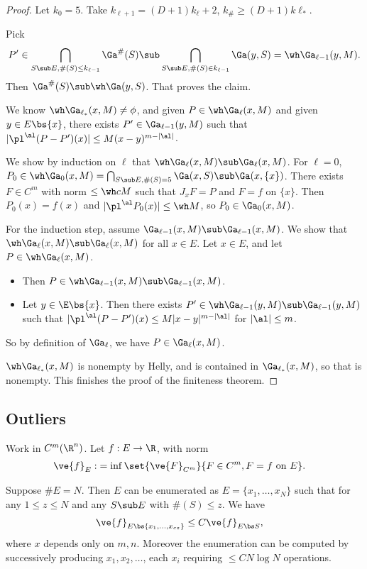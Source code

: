 \begin{proof}
Let $k_0=5$. Take $k_{\ell+1} = (D+1)k_\ell + 2$, $k_\#\ge (D+1)k \ell_*$. 

Pick 
\begin{align}
P'\in \bigcap_{S\sub E, \#(S)\le k_{\ell-1}} \Ga^\#(S) \sub \bigcap_{S\sub E, \#(S)\in k_{\ell-1}} \Ga(y,S) =\wh\Ga_{\ell-1}(y,M).
\end{align}
Then $\Ga^\#(S)\sub \wh \Ga(y,S)$. %
That proves the claim. %

We know $\wh \Ga_{\ell_*}(x,M)\ne \phi$, and given $P\in \wh \Ga_\ell(x,M)$ and given $y\in E\bs \{x\}$, there exists $P'\in \Ga_{\ell-1}(y,M)$ such that $|\pl^\al(P-P')(x)|\le M(x-y)^{m-|\al|}$. 

We show by induction on $\ell$ that $\wh \Ga_\ell(x,M)\sub \Ga_\ell(x,M)$. For $\ell=0$, $P_0\in \wh \Ga_0(x,M) = \bigcap_{S\sub E, \#(S)=5}\Ga(x,S) \sub \Ga(x,\{x\})$. There exists $F\in C^m$ with norm $\le \wh c M$ such that $J_xF=P$ and $F=f$ on $\{x\}$. Then $P_0(x)=f(x)$ and $|\pl^\al P_0(x)|\le \wh M$, so $P_0\in\Ga_0(x,M)$. 

For the induction step, assume $\Ga_{\ell-1}(x,M)\sub \Ga_{\ell-1}(x,M)$. We show that $\wh \Ga_\ell(x,M)\sub \Ga_\ell(x,M)$ for all $x\in E$. Let $x\in E$, and let $P\in \wh \Ga_\ell(x,M)$. 
\begin{itemize}
\item
Then $P\in \wh \Ga_{\ell-1}(x,M)\sub \Ga_{\ell-1}(x,M)$. 
\item 
Let $y\in \E\bs \{x\}$. Then there exists $P'\in\wh  \Ga_{\ell-1}(y,M)\sub \Ga_{\ell-1}(y,M)$ such that $|\pl^\al(P-P')(x)\le M|x-y|^{m-|\al|}$ for $|\al|\le m$. 
\end{itemize}
So by definition of $\Ga_\ell$, we have $P\in \Ga_\ell(x,M)$. 

$\wh \Ga_{\ell_*}(x,M)$ is nonempty by Helly, and is contained in $\Ga_{\ell_*}(x,M)$, so that is nonempty. %
This finishes the proof of the finiteness theorem.
\end{proof}

\subsection{Outliers}

Work in $C^m(\R^n)$. 
Let $f:E\to \R$, with norm
\begin{align}
\ve{f}_E:&= \inf\set{\ve{F}_{C^m}}{F\in C^m,F=f\text{ on }E}.
\end{align}
\begin{thm}
Suppose $\#E=N$. Then $E$ can be enumerated as $E=\{x_1,\ldots, x_N\}$ such that for any $1\le z\le N$ and any $S\sub E$ with $\#(S)\le z$. 
We have
\begin{align}
\ve{f}_{E\bs \{x_1,\ldots, x_{cz}\}} &\le C\ve{f}_{E\bs S},
\end{align}
where $x$ depends only on $m,n$.  Moreover the enumeration can be computed by successively producing $x_1,x_2,\ldots$, each $x_i$ requiring $\le CN\log N$ operations.
\end{thm}


